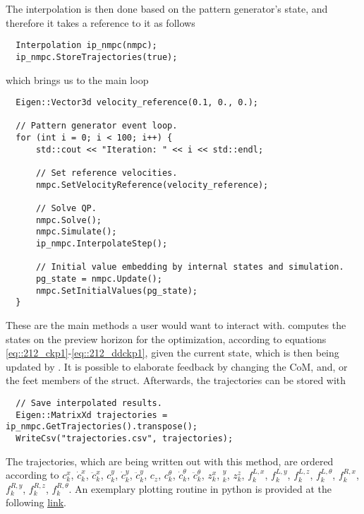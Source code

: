 The interpolation is then done based on the pattern generator's state, and therefore it takes a reference to it as follows
\begin{verbatim}
  Interpolation ip_nmpc(nmpc);
  ip_nmpc.StoreTrajectories(true);
\end{verbatim}
which brings us to the main loop
\begin{verbatim}
  Eigen::Vector3d velocity_reference(0.1, 0., 0.);

  // Pattern generator event loop.
  for (int i = 0; i < 100; i++) {
      std::cout << "Iteration: " << i << std::endl;

      // Set reference velocities.
      nmpc.SetVelocityReference(velocity_reference);

      // Solve QP.
      nmpc.Solve();
      nmpc.Simulate();
      ip_nmpc.InterpolateStep();

      // Initial value embedding by internal states and simulation.
      pg_state = nmpc.Update();
      nmpc.SetInitialValues(pg_state);
  }
\end{verbatim}
These are the main methods a user would want to interact with.  computes the states on the preview horizon for the optimization, according to equations \ref{eq::212_ckp1}-\ref{eq::212_ddckp1}, given the current state, which is then being updated by . It is possible to elaborate feedback by changing the CoM, and, or the feet members of the  struct. Afterwards, the trajectories can be stored with
\begin{verbatim}
  // Save interpolated results.
  Eigen::MatrixXd trajectories = ip_nmpc.GetTrajectories().transpose();
  WriteCsv("trajectories.csv", trajectories);
\end{verbatim}
The trajectories, which are being written out with this method, are ordered according to $c_k^x$, $\dot{c}_k^x$, $\ddot{c}_k^x$, $c_k^y$, $\dot{c}_k^y$, $\ddot{c}_k^y$, $c_z$, $c_k^\theta$, $\dot{c}_k^\theta$, $\ddot{c}_k^\theta$, $z_k^x$, $_k^y$, $z_k^z$, $f_k^{L,x}$, $f_k^{L,y}$, $f_k^{L,z}$, $f_k^{L,\theta}$, $f_k^{R,x}$, $f_k^{R,y}$, $f_k^{R,z}$, $f_k^{R,\theta}$. An exemplary plotting routine in python is provided at the following \href{https://github.com/mhubii/nmpc_pattern_generator/blob/719fde0bb73925923de85cbf379c5523e075dfeb/plot/plot_pattern.py#L15}{\underline{link}}.
\\
